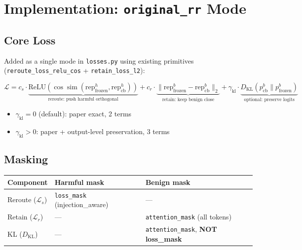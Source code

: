\documentclass[11pt]{article}
\begin{document}
\section{Implementation: \texttt{original\_rr} Mode}

\subsection{Core Loss}

Added as a single mode in \texttt{losses.py} using existing primitives
(\texttt{reroute\_loss\_relu\_cos} + \texttt{retain\_loss\_l2}):

\begin{equation}
  \mathcal{L} = c_s \cdot \underbrace{\mathrm{ReLU}(\cos\!\operatorname{sim}(\mathrm{rep}_\mathrm{frozen}^h, \mathrm{rep}_\mathrm{cb}^h))}_{\text{reroute: push harmful orthogonal}}
  + c_r \cdot \underbrace{\|\mathrm{rep}_\mathrm{frozen}^b - \mathrm{rep}_\mathrm{cb}^b\|_2}_{\text{retain: keep benign close}}
  + \gamma_\mathrm{kl} \cdot \underbrace{D_\mathrm{KL}(p_\mathrm{cb}^b \| p_\mathrm{frozen}^b)}_{\text{optional: preserve logits}}
\end{equation}

\begin{itemize}
  \item $\gamma_\mathrm{kl} = 0$ (default): paper exact, 2 terms
  \item $\gamma_\mathrm{kl} > 0$: paper + output-level preservation, 3 terms
\end{itemize}

\subsection{Masking}

\begin{center}
\begin{tabular}{lll}
\toprule
Component & Harmful mask & Benign mask \\
\midrule
Reroute ($\mathcal{L}_s$) & \texttt{loss\_mask} (injection\_aware) & --- \\
Retain ($\mathcal{L}_r$) & --- & \texttt{attention\_mask} (all tokens) \\
KL ($D_\mathrm{KL}$) & --- & \texttt{attention\_mask}, \textbf{NOT loss\_mask} \\
\bottomrule
\end{tabular}
\end{center}
\end{document}
